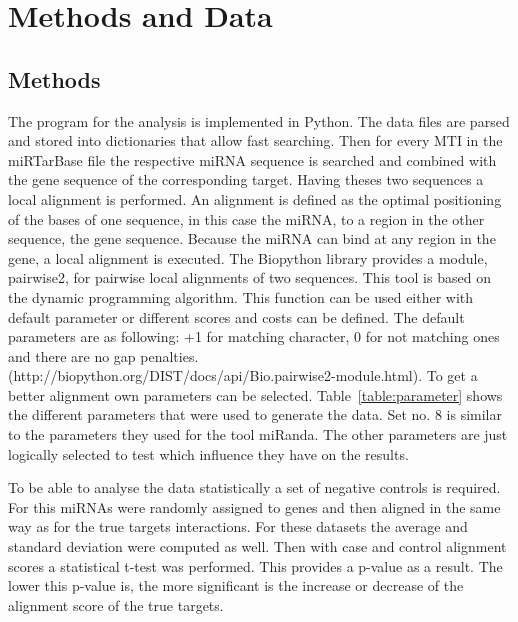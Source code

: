 \documentclass[12pt]{article}
\begin{document}
\section{Methods and Data}
\subsection{Methods}
The program for the analysis is implemented in Python. The data files are parsed and stored into dictionaries that allow fast searching. Then for every MTI in the miRTarBase file the respective miRNA sequence is searched and combined with the gene sequence of the corresponding target. Having theses two sequences a local alignment is performed. An alignment is defined as the optimal positioning of the bases of one sequence, in this case the miRNA, to a region in the other sequence, the gene sequence. Because the miRNA can bind at any region in the gene, a local alignment is executed. The Biopython library provides a module, pairwise2, for pairwise local alignments of two sequences. This tool is based on the dynamic programming algorithm. This function can be used either with default parameter or different scores and costs can be defined. The default parameters are as following: +1 for matching character, 0 for not matching ones and there are no gap penalties. (http://biopython.org/DIST/docs/api/Bio.pairwise2-module.html). To get a better alignment own parameters can be selected. Table~\ref{table:parameter} shows the different parameters that were used to generate the data. Set no. 8 is similar to the parameters they used for the tool miRanda. The other parameters are just logically selected to test which influence they have on the results. 

To be able to analyse the data statistically a set of negative controls is required. For this miRNAs were randomly assigned to genes and then aligned in the same way as for the true targets interactions. For these datasets the average and standard deviation were computed as well. Then with case and control alignment scores a statistical t-test was performed. This provides a p-value as a result. The lower this p-value is, the more significant is the increase or decrease of the alignment score of the true targets.
\end{document}
